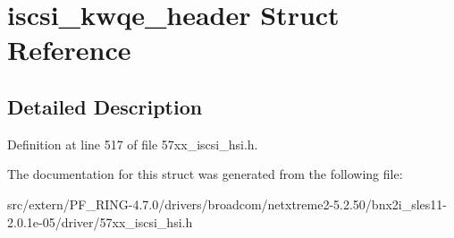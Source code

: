 \hypertarget{structiscsi__kwqe__header}{
\section{iscsi\_\-kwqe\_\-header Struct Reference}
\label{structiscsi__kwqe__header}
}


\subsection{Detailed Description}


Definition at line 517 of file 57xx\_\-iscsi\_\-hsi.h.



The documentation for this struct was generated from the following file:\begin{DoxyCompactItemize}
\item 
src/extern/PF\_\-RING-\/4.7.0/drivers/broadcom/netxtreme2-\/5.2.50/bnx2i\_\-sles11-\/2.0.1e-\/05/driver/57xx\_\-iscsi\_\-hsi.h\end{DoxyCompactItemize}
